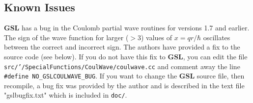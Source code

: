 \documentclass[10pt]{article}
\begin{document}



\subsection{Known Issues}

{\bf GSL} has a bug in the Coulomb partial wave routines for versions 1.7 and earlier. The sign of the wave function for larger ($>$3) values of $x=qr/\hbar$ oscillates between the correct and incorrect sign. The authors have provided a fix to the source code (see below). If you do not have this fix to {\bf GSL}, you can edit the file {\tt src/'/SpecialFunctions/CoulWave/coulwave.cc} and comment away the line {\tt \#define NO\_GSLCOULWAVE\_BUG}. If you want to change the {\bf GSL} source file, then recompile, a bug fix was provided by the author and is described in the text file "gslbugfix.txt" which is included in  {\tt doc/}.

\end{document}

